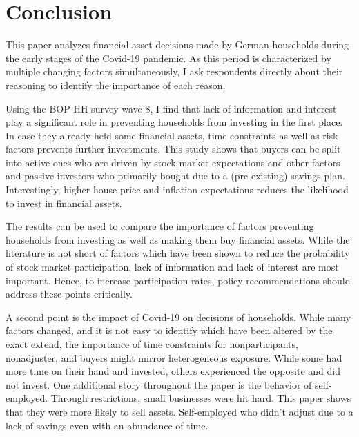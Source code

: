 \documentclass[ProjectABM]{subfiles}
\begin{document}
\section{Conclusion}\label{sec:conclusion}
This paper analyzes financial asset decisions made by German households during the early stages of the Covid-19 pandemic. As this period is characterized by multiple changing factors simultaneously, I ask respondents directly about their reasoning to identify the importance of each reason. 

Using the BOP-HH survey wave 8, I find that lack of information and interest play a significant role in preventing households from investing in the first place. In case they already held some financial assets, time constraints as well as risk factors prevents further investments. This study shows that buyers can be split into active ones who are driven by stock market expectations and other factors and passive investors who primarily bought due to a (pre-existing) savings plan. Interestingly, higher house price and inflation expectations reduces the likelihood to invest in financial assets.

The results can be used to compare the importance of factors preventing households from investing as well as making them buy financial assets. While the literature is not short of factors which have been shown to reduce the probability of stock market participation, lack of information and lack of interest are most important. Hence, to increase participation rates, policy recommendations should address these points critically.

A second point is the impact of Covid-19 on decisions of households. While many factors changed, and it is not easy to identify which have been altered by the exact extend, the importance of time constraints for nonparticipants, nonadjuster, and buyers might mirror heterogeneous exposure. While some had more time on their hand and invested, others experienced the opposite and did not invest. One additional story throughout the paper is the behavior of self-employed. Through restrictions, small businesses were hit hard. This paper shows that they were more likely to sell assets. Self-employed who didn't adjust due to a lack of savings even with an abundance of time.
\end{document}
